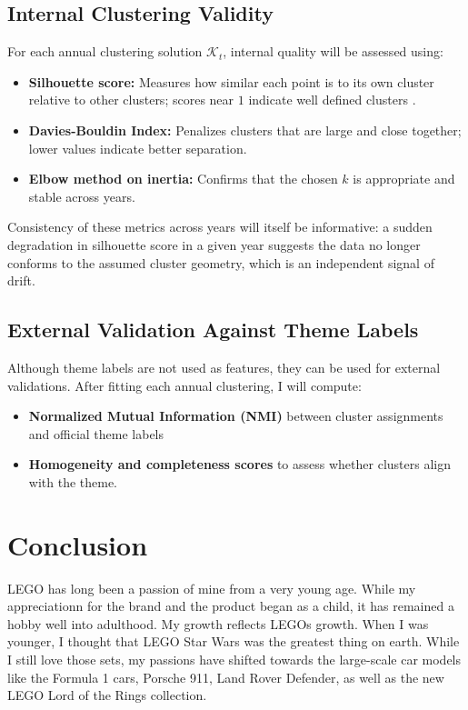 \documentclass[11pt, letterpaper]{article}
\begin{document}
\subsection{Internal Clustering Validity}

For each annual clustering solution $\mathcal{K}_t$, internal quality will be assessed using:
\begin{itemize}
    \item \textbf{Silhouette score:} Measures how similar each point is to its own cluster relative to other clusters; scores near $1$ indicate well defined clusters \cite{rousseeuw1987silhouettes}.
    \item \textbf{Davies-Bouldin Index:} Penalizes clusters that are large and close together; lower values indicate better separation.
    \item \textbf{Elbow method on inertia:} Confirms that the chosen $k$ is appropriate and stable across years.
\end{itemize}

Consistency of these metrics across years will itself be informative: a sudden degradation in silhouette score in a given year suggests the data no longer conforms to the assumed cluster geometry, which is an independent signal of drift.

\subsection{External Validation Against Theme Labels}

Although theme labels are not used as features, they can be used for external validations. After fitting each annual clustering, I will compute:
\begin{itemize}
    \item \textbf{Normalized Mutual Information (NMI)} between cluster assignments and official theme labels
    \item \textbf{Homogeneity and completeness scores} to assess whether clusters align with the theme.
\end{itemize}

\section{Conclusion}

LEGO has long been a passion of mine from a very young age. While my appreciationn for the brand and the product began as a child, it has remained a hobby well into adulthood. My growth reflects LEGOs growth. When I was younger, I thought that LEGO Star Wars was the greatest thing on earth. While I still love those sets, my passions have shifted towards the large-scale car models like the Formula 1 cars, Porsche 911, Land Rover Defender, as well as the new LEGO Lord of the Rings collection.
\end{document}
